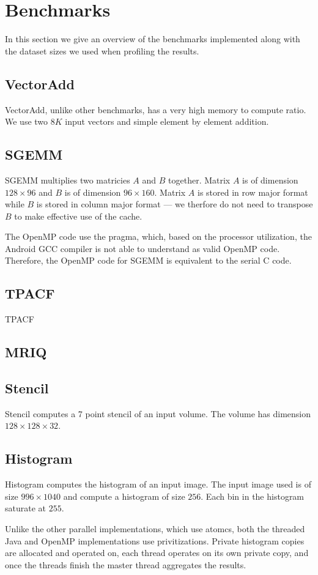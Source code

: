 \section{Benchmarks}

In this section we give an overview of the benchmarks implemented along with 
	the dataset sizes we used when profiling the results.

\subsection{VectorAdd}

VectorAdd, unlike other benchmarks, has a very high memory to compute ratio.
We use two $8K$ input vectors and simple element by element addition.

\subsection{SGEMM}


SGEMM multiplies two matricies $A$ and $B$ together.
Matrix $A$ is of dimension $128 \times 96$ and $B$ is of dimension $96 \times 160$.
Matrix $A$ is stored in row major format while $B$ is stored in column major format --- we therfore do not need to transpose $B$ to make effective use of the cache.

The OpenMP code use the  pragma, which, based on the processor utilization, the Android GCC compiler is not able to understand as valid OpenMP code.
Therefore, the OpenMP code for SGEMM is equivalent to the serial C code.

\subsection{TPACF}

TPACF 

\subsection{MRIQ}



\subsection{Stencil}

Stencil computes a 7 point stencil of an input volume. 
The volume has dimension $128 \times 128 \times 32$.

\subsection{Histogram}

Histogram computes the histogram of an input image.
The input image used is of size $996 \times 1040$ and compute a 
	histogram of size $256$.
Each bin in the histogram saturate at $255$.

Unlike the other parallel implementations, which use atomcs, both the
	threaded Java and OpenMP implementations use privitizations.
Private histogram copies are allocated and operated on, each thread 
	operates on its own private copy, and once the threads finish the
	master thread aggregates the results.

